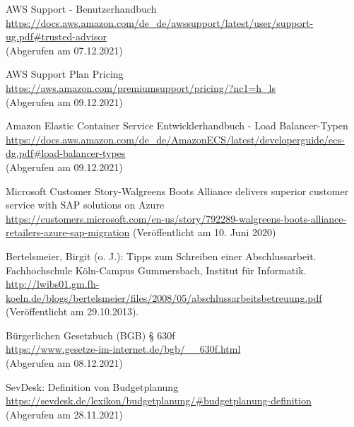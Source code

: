 \begin{thebibliography}{HR08}

    AWS Support - Benutzerhandbuch\\
  \url{https://docs.aws.amazon.com/de_de/awssupport/latest/user/support-ug.pdf#trusted-advisor}\\
  (Abgerufen am 07.12.2021)

   AWS Support Plan Pricing\\
  \url{https://aws.amazon.com/premiumsupport/pricing/?nc1=h_ls}\\
  (Abgerufen am 09.12.2021)

    Amazon Elastic Container Service Entwicklerhandbuch - Load Balancer-Typen\\
  \url{https://docs.aws.amazon.com/de_de/AmazonECS/latest/developerguide/ecs-dg.pdf#load-balancer-types}\\
  (Abgerufen am 09.12.2021)

   Microsoft Customer Story-Walgreens Boots Alliance delivers superior customer service with SAP solutions on Azure \\
  \url{https://customers.microsoft.com/en-us/story/792289-walgreens-boots-alliance-retailers-azure-sap-migration}
  (Veröffentlicht am 10. Juni 2020)

  Bertelsmeier, Birgit (o. J.): Tipps zum Schrei\-b\-en ei\-n\-er Ab\-sch\-luss\-ar\-beit. Fach\-hoch\-schu\-le Köln-Campus Gummersbach, Institut für Informatik. \\
  \url{http://lwibs01.gm.fh-koeln.de/blogs/bertelsmeier/files/2008/05/abschlussarbeitsbetreuung.pdf} (Veröffentlicht am 29.10.2013).

   Bürgerlichen Gesetzbuch (BGB) § 630f\\
  \url{https://www.gesetze-im-internet.de/bgb/__630f.html}\\
  (Abgerufen am 08.12.2021)

  SevDesk: Definition von Budgetplanung\\
  \url{https://sevdesk.de/lexikon/budgetplanung/#budgetplanung-definition}\\
  (Abgerufen am 28.11.2021)


\end{thebibliography}
